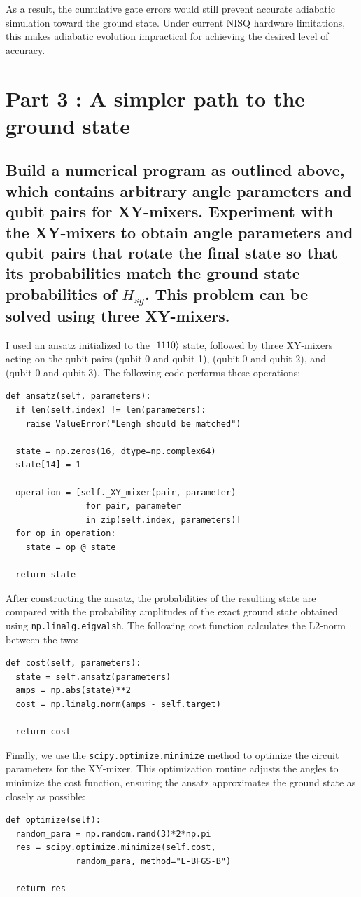 \documentclass[a4paper, 11pt]{article}
\begin{document}
As a result, the cumulative gate errors would still prevent accurate adiabatic simulation toward the ground state. 
Under current NISQ hardware limitations, this makes adiabatic evolution impractical for achieving the desired level of accuracy.

\section*{Part 3 : A simpler path to the ground state}

\subsection*{Build a numerical program as outlined above, which contains arbitrary angle parameters and qubit pairs for XY-mixers. Experiment with the XY-mixers to obtain angle parameters and qubit pairs that rotate the final state so that its probabilities match the ground state probabilities of $H_{sg}$. This problem can be solved using three XY-mixers.}
I used an ansatz initialized to the $\ket{1110}$ state, followed by three XY-mixers acting on the qubit pairs (qubit-0 and qubit-1), (qubit-0 and qubit-2), and (qubit-0 and qubit-3). The following code performs these operations:
\begin{verbatim}
def ansatz(self, parameters):
  if len(self.index) != len(parameters):
    raise ValueError("Lengh should be matched")
  
  state = np.zeros(16, dtype=np.complex64)
  state[14] = 1

  operation = [self._XY_mixer(pair, parameter) 
                for pair, parameter 
                in zip(self.index, parameters)]
  for op in operation:
    state = op @ state

  return state
\end{verbatim}
After constructing the ansatz, the probabilities of the resulting state are compared with the probability amplitudes of the exact ground state obtained using \texttt{np.linalg.eigvalsh}. The following cost function calculates the L2-norm between the two:
\begin{verbatim}
def cost(self, parameters):
  state = self.ansatz(parameters)
  amps = np.abs(state)**2
  cost = np.linalg.norm(amps - self.target)

  return cost
\end{verbatim}
Finally, we use the \texttt{scipy.optimize.minimize} method to optimize the circuit parameters for the XY-mixer. This optimization routine adjusts the angles to minimize the cost function, ensuring the ansatz approximates the ground state as closely as possible:
\begin{verbatim}
def optimize(self):
  random_para = np.random.rand(3)*2*np.pi
  res = scipy.optimize.minimize(self.cost, 
              random_para, method="L-BFGS-B")

  return res
\end{verbatim}
\end{document}
